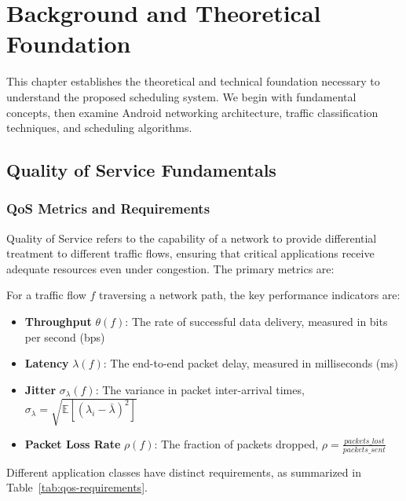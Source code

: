 \chapter{Background and Theoretical Foundation}
\label{ch:background}

This chapter establishes the theoretical and technical foundation necessary to understand the proposed \qos scheduling system. We begin with fundamental \qos concepts, then examine Android networking architecture, traffic classification techniques, and scheduling algorithms.

\section{Quality of Service Fundamentals}
\label{sec:qos-fundamentals}

\subsection{QoS Metrics and Requirements}

Quality of Service refers to the capability of a network to provide differential treatment to different traffic flows, ensuring that critical applications receive adequate resources even under congestion. The primary \qos metrics are:

\begin{definition}
For a traffic flow $f$ traversing a network path, the key performance indicators are:
\begin{itemize}
    \item \textbf{Throughput} $\theta(f)$: The rate of successful data delivery, measured in bits per second (bps)
    \item \textbf{Latency} $\lambda(f)$: The end-to-end packet delay, measured in milliseconds (ms)
    \item \textbf{Jitter} $\sigma_\lambda(f)$: The variance in packet inter-arrival times, $\sigma_\lambda = \sqrt{\mathbb{E}[(\lambda_i - \bar{\lambda})^2]}$
    \item \textbf{Packet Loss Rate} $\rho(f)$: The fraction of packets dropped, $\rho = \frac{packets\_lost}{packets\_sent}$
\end{itemize}
\end{definition}

Different application classes have distinct \qos requirements, as summarized in Table~\ref{tab:qos-requirements}.

